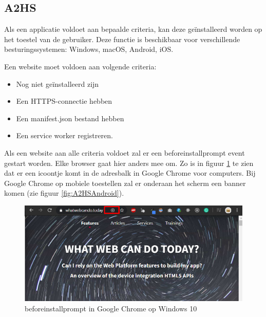 \subsection{A2HS}

	
	Als een applicatie voldoet aan bepaalde criteria, kan deze geïnstalleerd worden op het toestel van de gebruiker. Deze functie is beschikbaar voor verschillende besturingssystemen: Windows, macOS, Android, iOS.
	
	Een website moet voldoen aan volgende criteria:
	
	\begin{itemize}
		\item	Nog niet geïnstalleerd zijn
		\item	Een HTTPS-connectie hebben
		\item	Een manifest.json bestand hebben
		\item	Een service worker registreren.
	\end{itemize}
	
	Als een website aan alle criteria voldoet zal er een beforeinstallprompt event gestart worden. Elke browser gaat hier anders mee om. 
	Zo is in figuur \ref{fig:A2HSWindows} te zien dat er een icoontje komt in de adresbalk in Google Chrome voor computers. Bij Google Chrome op mobiele toestellen zal er onderaan het scherm een banner komen (zie figuur \ref{fig:A2HSAndroid}).
	
	\begin{figure}[H]
		\centering
		\includegraphics{./img/beforeinstallprompt_windows.png}	
		\caption{beforeinstallprompt in Google Chrome op Windows 10}
		\label{fig:A2HSWindows}
	\end{figure}
	
